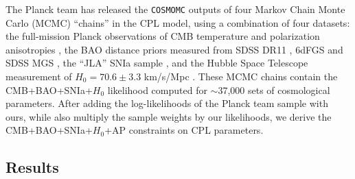 \documentclass[iop]{emulateapj}
\begin{document}
The Planck team has released the {\texttt {COSMOMC}} \citep{LB2002} outputs of four Markov Chain Monte Carlo (MCMC) 
``chains'' in the CPL model, 
using a combination of four datasets:
the full-mission Planck observations of CMB temperature and polarization anisotropies \citep{Planck2015},
the BAO distance priors measured from SDSS DR11 \citep{Anderson2013}, 6dFGS \citep{6dFGS} and SDSS MGS \citep{MGS},
the ``JLA'' SNIa sample \citep{JLA},
and the Hubble Space Telescope measurement of $H_0=70.6\pm3.3$ km/s/Mpc \citep{Riess2011,E14H0}.
These MCMC chains contain the CMB+BAO+SNIa+$H_0$ likelihood computed for $\sim$37,000 sets of cosmological parameters.
After adding the log-likelihoods of the Planck team sample with ours, 
while also multiply the sample weights by our likelihoods, 
we derive the CMB+BAO+SNIa+$H_0$+AP constraints on CPL parameters. %

\subsection{Results}
\end{document}

